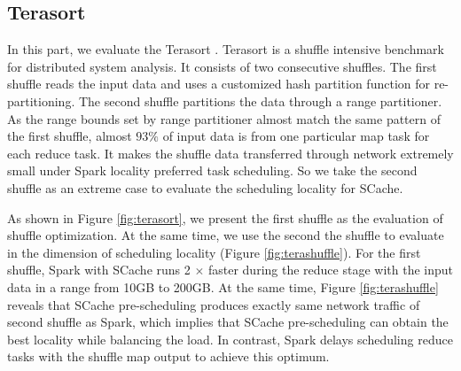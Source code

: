 \subsection{Terasort}
In this part, we evaluate the Terasort \cite{spark-tera}.
Terasort \cite{spark-tera} is a shuffle intensive benchmark for distributed system analysis. It consists of two consecutive shuffles. The first shuffle reads the input data and uses a customized hash partition function for re-partitioning. The second shuffle partitions the data through a range partitioner. As the range bounds set by range partitioner almost match the same pattern of the first shuffle, almost $93\%$ of input data is from one particular map task for each reduce task. It makes the shuffle data transferred through network extremely small under Spark locality preferred task scheduling. So we take the second shuffle as an extreme case to evaluate the scheduling locality for SCache.

As shown in Figure \ref{fig:terasort}, we present the first shuffle as the evaluation of shuffle optimization. At the same time, we use the second the shuffle to evaluate in the dimension of scheduling locality (Figure \ref{fig:terashuffle}). For the first shuffle, Spark with SCache runs 2 $\times$ faster during the reduce stage with the input data in a range from 10GB to 200GB. At the same time, Figure \ref{fig:terashuffle} reveals that SCache pre-scheduling produces exactly same network traffic of second shuffle as Spark, which implies that SCache pre-scheduling can obtain the best locality while balancing the load. In contrast, Spark delays scheduling reduce tasks with the shuffle map output to achieve this optimum.

